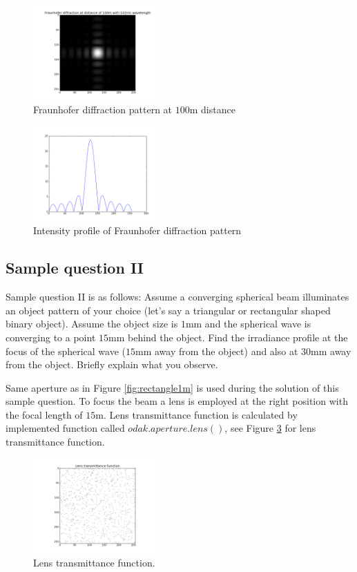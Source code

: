 \documentclass[journal,9pt]{IEEEtran}
\begin{document}
\begin{figure}[H]
\centering
\includegraphics[width=1.9in]{q1d100m}
\caption{Fraunhofer diffraction pattern at $100$m distance}
\label{fig:q1d100m}
\end{figure}

\begin{figure}[H]
\centering
\includegraphics[width=1.9in]{q1i100m}
\caption{Intensity profile of Fraunhofer diffraction pattern}
\label{fig:q1i100m}
\end{figure}

\subsection{Sample question II}
Sample question II is as follows: Assume a converging spherical beam illuminates an object pattern of your choice (let's say a triangular or rectangular shaped binary object). Assume the object size is $1$mm and the spherical wave is converging to a point $15$mm behind the object. Find the irradiance profile at the focus of the spherical wave ($15$mm away from the object) and also at $30$mm away from the object. Briefly explain what you observe.

Same aperture as in Figure \ref{fig:rectangle1m} is used during the solution of this sample question. To focus the beam a lens is employed at the right position with the focal length of $15$m. Lens transmittance function is calculated by implemented function called $odak.aperture.lens()$, see Figure \ref{fig:lenstrans} for lens transmittance function.

\lstset{language=Python,breaklines=true}


\begin{figure}[H]
\centering
\includegraphics[width=1.9in]{lenstrans}
\caption{Lens transmittance function.}
\label{fig:lenstrans}
\end{figure}
\end{document}
